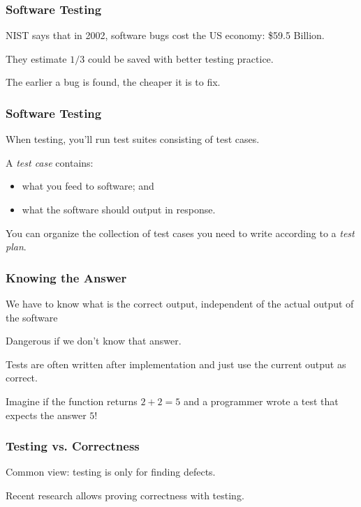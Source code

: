 \begin{frame}
\frametitle{Software Testing}
\begin{changemargin}{1cm}
NIST says that in 2002, software bugs cost the US economy: \$59.5 Billion.

They estimate $1/3$ could be saved with better testing practice.

The earlier a bug is found, the cheaper it is to fix.

\end{changemargin}
\end{frame}

\begin{frame}
\frametitle{Software Testing}
\begin{changemargin}{1cm}

When testing, you'll run \alert{test suites} consisting of \alert{test
  cases}.

A \emph{test case} contains:
\begin{itemize}
\item what you feed to software; and
\item what the software should output in response.  
\end{itemize} 

You can organize the collection of test cases you need to write
according to a \emph{test plan}.

\end{changemargin}
\end{frame}

\begin{frame}
\frametitle{Knowing the Answer}
\begin{changemargin}{1cm}
We have to know what is the correct output, independent of the actual output of the software

Dangerous if we don't know that answer.

Tests are often written after implementation and just use the current output as correct.

Imagine if the function returns $2 + 2 = 5$ and a programmer wrote a test that expects the answer $5$!

\end{changemargin}
\end{frame}


\begin{frame}
\frametitle{Testing vs. Correctness}
\begin{changemargin}{1cm}

Common view: testing is only for finding defects.

Recent research allows proving correctness with testing.

\end{changemargin}
\end{frame}

